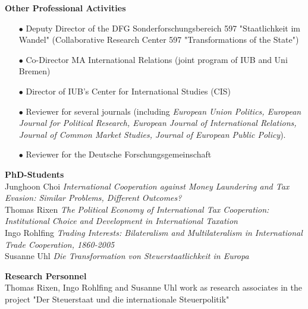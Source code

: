 \vspace{0.6cm}
\textbf{Other Professional Activities}\\[-0.25cm]
\begin{enumerate}
\item[$\bullet$]	Deputy Director of the DFG Sonderforschungsbereich 597 "Staatlichkeit im Wandel" (Collaborative Research Center 597 "Transformations of the State")
\item[$\bullet$]	Co-Director MA International Relations (joint program of IUB and Uni Bremen)
\item[$\bullet$]	Director of IUB's Center for International Studies (CIS)
\item[$\bullet$]	Reviewer for several journals (including \textit{European Union Politics, European Journal for Political Research, European Journal of International Relations, Journal of Common Market Studies, Journal of European Public Policy}).
\item[$\bullet$]	Reviewer for the Deutsche Forschungsgemeinschaft
\end{enumerate}


\vspace{0.6cm}
\textbf{PhD-Students}\\[-0.25cm]

Junghoon Choi\newline
\textit{International Cooperation against Money Laundering and Tax Evasion: Similar Problems, Different Outcomes?}\\[-0.15cm]

Thomas Rixen\newline
\textit{The Political Economy of International Tax Cooperation: Institutional Choice and Development in International Taxation}\\[-0.15cm]

Ingo Rohlfing\newline
\textit{Trading Interests: Bilateralism and Multilateralism in International Trade Cooperation, 1860-2005}\\[-0.15cm]

Susanne Uhl\newline
\textit{Die Transformation von Steuerstaatlichkeit in Europa}


\vspace{0.6cm}
\textbf{Research Personnel}\\[-0.25cm]

Thomas Rixen, Ingo Rohlfing and Susanne Uhl work as research associates in the project "Der Steuerstaat und die internationale Steuerpolitik"
